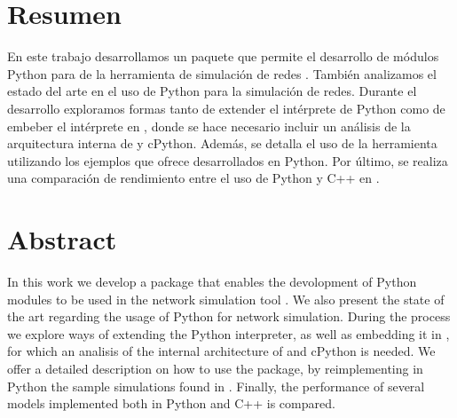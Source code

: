 \chapter*{Resumen}
En este trabajo desarrollamos un paquete que permite el desarrollo de módulos
Python para de la herramienta de simulación de redes \omnetpp{}. También
analizamos el estado del arte en el uso de Python para la simulación de redes.
Durante el desarrollo exploramos formas tanto de extender el intérprete de
Python como de embeber el intérprete en \omnetpp{}, donde se hace necesario
incluir un análisis de la arquitectura interna de \omnetpp{} y cPython. Además,
se detalla el uso de la herramienta utilizando los ejemplos que ofrece
\omnetpp{} desarrollados en Python. Por último, se realiza una comparación de
rendimiento entre el uso de Python y C++ en \omnetpp{}.

\chapter*{Abstract}
In this work we develop a package that enables the devolopment of Python
modules to be used in the network simulation tool \omnetpp{}. We also present
the state of the art regarding the usage of Python for network simulation.
During the process we explore ways of extending the Python interpreter, as well
as embedding it in \omnetpp{}, for which an analisis of the internal
architecture of \omnetpp{} and cPython is needed.  We offer a detailed
description on how to use the package, by reimplementing in Python the sample
simulations found in \omnetpp{}. Finally, the performance of several \omnetpp{}
models implemented both in Python and C++ is compared.
